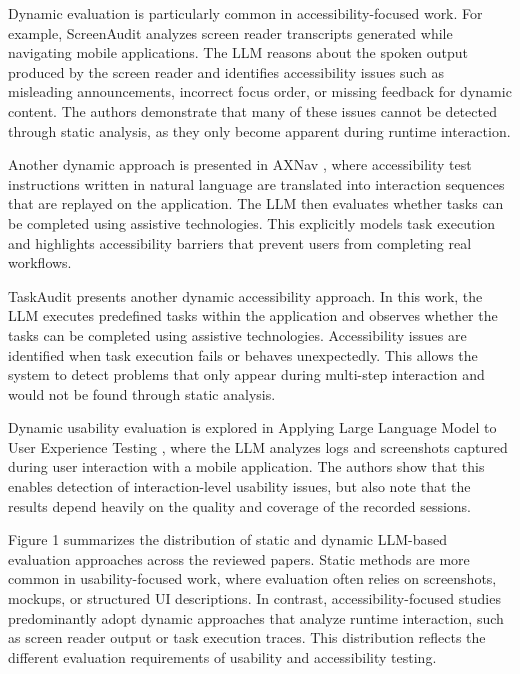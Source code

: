 \documentclass[acmsmall,nonacm]{acmart}
\begin{document}
Dynamic evaluation is particularly common in accessibility-focused work. For example, ScreenAudit \cite{zhong2024screenaudit} analyzes screen reader transcripts generated while navigating mobile applications. The LLM reasons about the spoken output produced by the screen reader and identifies accessibility issues such as misleading announcements, incorrect focus order, or missing feedback for dynamic content. The authors demonstrate that many of these issues cannot be detected through static analysis, as they only become apparent during runtime interaction.

Another dynamic approach is presented in AXNav \cite{taeb2023axnav}, where accessibility test instructions written in natural language are translated into interaction sequences that are replayed on the application. The LLM then evaluates whether tasks can be completed using assistive technologies. This explicitly models task execution and highlights accessibility barriers that prevent users from completing real workflows.

TaskAudit \cite{zhong2024taskaudit} presents another dynamic accessibility approach. In this work, the LLM executes predefined tasks within the application and observes whether the tasks can be completed using assistive technologies. Accessibility issues are identified when task execution fails or behaves unexpectedly. This allows the system to detect problems that only appear during multi-step interaction and would not be found through static analysis.

Dynamic usability evaluation is explored in Applying Large Language Model to User Experience Testing \cite{hsueh2023llm_ux_testing}, where the LLM analyzes logs and screenshots captured during user interaction with a mobile application. The authors show that this enables detection of interaction-level usability issues, but also note that the results depend heavily on the quality and coverage of the recorded sessions.

Figure 1 summarizes the distribution of static and dynamic LLM-based evaluation approaches across the reviewed papers. Static methods are more common in usability-focused work, where evaluation often relies on screenshots, mockups, or structured UI descriptions. In contrast, accessibility-focused studies predominantly adopt dynamic approaches that analyze runtime interaction, such as screen reader output or task execution traces. This distribution reflects the different evaluation requirements of usability and accessibility testing.
\end{document}
